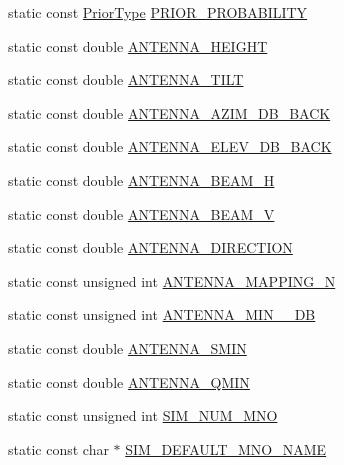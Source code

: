 \begin{DoxyCompactItemize}
\item 
static const \mbox{\hyperlink{_prior_type_8h_a61286c562e68de246982fc393a7c23a5}{Prior\+Type}} \mbox{\hyperlink{class_constants_a7b31976adc7ad0f3dbed86b205e1773d}{P\+R\+I\+O\+R\+\_\+\+P\+R\+O\+B\+A\+B\+I\+L\+I\+TY}}
\item 
static const double \mbox{\hyperlink{class_constants_adfe27efa61ae50b73c74b3f19c292625}{A\+N\+T\+E\+N\+N\+A\+\_\+\+H\+E\+I\+G\+HT}}
\item 
static const double \mbox{\hyperlink{class_constants_ad92a5c99071f0d843ee555e74c5f909a}{A\+N\+T\+E\+N\+N\+A\+\_\+\+T\+I\+LT}}
\item 
static const double \mbox{\hyperlink{class_constants_aa2030f2c0ec89fb7cc06b31bbb50793d}{A\+N\+T\+E\+N\+N\+A\+\_\+\+A\+Z\+I\+M\+\_\+\+D\+B\+\_\+\+B\+A\+CK}}
\item 
static const double \mbox{\hyperlink{class_constants_a8efdd6e1f2a25c24cb6dbff363e2d61a}{A\+N\+T\+E\+N\+N\+A\+\_\+\+E\+L\+E\+V\+\_\+\+D\+B\+\_\+\+B\+A\+CK}}
\item 
static const double \mbox{\hyperlink{class_constants_a4e4a0a48ad06c458ae4f3e6d0e4e6608}{A\+N\+T\+E\+N\+N\+A\+\_\+\+B\+E\+A\+M\+\_\+H}}
\item 
static const double \mbox{\hyperlink{class_constants_a2389355f6184d3b7903e154b46d069f5}{A\+N\+T\+E\+N\+N\+A\+\_\+\+B\+E\+A\+M\+\_\+V}}
\item 
static const double \mbox{\hyperlink{class_constants_ad82a10e13ae9e1cbce1cef616e47df31}{A\+N\+T\+E\+N\+N\+A\+\_\+\+D\+I\+R\+E\+C\+T\+I\+ON}}
\item 
static const unsigned int \mbox{\hyperlink{class_constants_a5db3a5bad9c514c994e71063dee2a798}{A\+N\+T\+E\+N\+N\+A\+\_\+\+M\+A\+P\+P\+I\+N\+G\+\_\+N}}
\item 
static const unsigned int \mbox{\hyperlink{class_constants_a2bda61c04e204f4a1279338fb790e1f4}{A\+N\+T\+E\+N\+N\+A\+\_\+\+M\+I\+N\+\_\+\_\+\+DB}}
\item 
static const double \mbox{\hyperlink{class_constants_af58b693e1ab4cdb1e83399eb0f2af647}{A\+N\+T\+E\+N\+N\+A\+\_\+\+S\+M\+IN}}
\item 
static const double \mbox{\hyperlink{class_constants_a9149aaac071422191e4417885fd42b07}{A\+N\+T\+E\+N\+N\+A\+\_\+\+Q\+M\+IN}}
\item 
static const unsigned int \mbox{\hyperlink{class_constants_a763bdd9401295d6b691c93cf580e562a}{S\+I\+M\+\_\+\+N\+U\+M\+\_\+\+M\+NO}}
\item 
static const char $\ast$ \mbox{\hyperlink{class_constants_a186cf83e20074a889823a7f36e50ad8c}{S\+I\+M\+\_\+\+D\+E\+F\+A\+U\+L\+T\+\_\+\+M\+N\+O\+\_\+\+N\+A\+ME}}

\end{DoxyCompactItemize}
